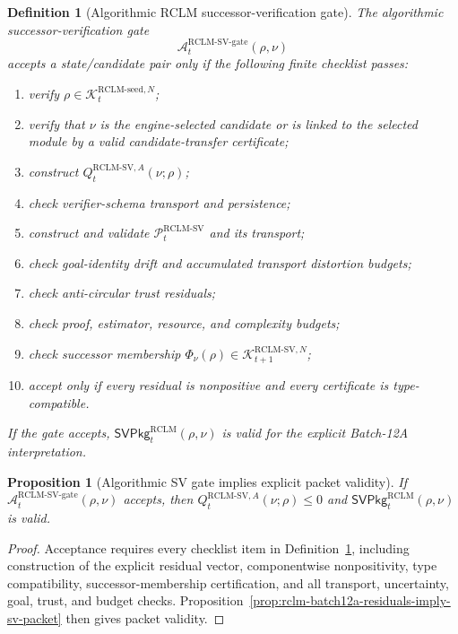 \documentclass[11pt,a4paper]{article}
\newtheorem{proposition}[theorem]{Proposition}
\newtheorem{definition}[theorem]{Definition}
\newcommand{\Pcal}{\mathcal P}
\newcommand{\Acal}{\mathcal A}
\newcommand{\Kcal}{\mathcal K}
\newcommand{\RCLM}{\mathrm{RCLM}}
\newcommand{\gate}{\mathrm{gate}}
\begin{document}
\begin{definition}[Algorithmic RCLM successor-verification gate]
\label{def:rclm-batch12a-algorithmic-sv-gate}
The algorithmic successor-verification gate
\[
\Acal_t^{\RCLM\text{-}\mathrm{SV}\text{-}\gate}(\rho,
\nu)
\]
accepts a state/candidate pair only if the following finite checklist passes:
\begin{enumerate}[label=(\arabic*),leftmargin=1.5em]
    \item verify \(\rho\in\Kcal_t^{\RCLM\text{-}\mathrm{seed},N}\);
    \item verify that \(\nu\) is the engine-selected candidate or is linked to the selected module by a valid candidate-transfer certificate;
    \item construct \(Q_t^{\RCLM\text{-}\mathrm{SV},A}(\nu;\rho)\);
    \item check verifier-schema transport and persistence;
    \item construct and validate \(\Pcal_t^{\RCLM\text{-}\mathrm{SV}}\) and its transport;
    \item check goal-identity drift and accumulated transport distortion budgets;
    \item check anti-circular trust residuals;
    \item check proof, estimator, resource, and complexity budgets;
    \item check successor membership \(\Phi_\nu(\rho)\in\Kcal_{t+1}^{\RCLM\text{-}\mathrm{SV},N}\);
    \item accept only if every residual is nonpositive and every certificate is type-compatible.
\end{enumerate}
If the gate accepts, \(\mathsf{SVPkg}_t^{\RCLM}(\rho,
\nu)\) is valid for the explicit Batch-12A interpretation.
\end{definition}

\begin{proposition}[Algorithmic SV gate implies explicit packet validity]
\label{prop:rclm-batch12a-algorithmic-gate-implies-packet}
If \(\Acal_t^{\RCLM\text{-}\mathrm{SV}\text{-}\gate}(\rho,
\nu)\) accepts, then \(Q_t^{\RCLM\text{-}\mathrm{SV},A}(\nu;\rho)\le0\) and \(\mathsf{SVPkg}_t^{\RCLM}(\rho,
\nu)\) is valid.
\end{proposition}

\begin{proof}
Acceptance requires every checklist item in Definition~\ref{def:rclm-batch12a-algorithmic-sv-gate}, including construction of the explicit residual vector, componentwise nonpositivity, type compatibility, successor-membership certification, and all transport, uncertainty, goal, trust, and budget checks. Proposition~\ref{prop:rclm-batch12a-residuals-imply-sv-packet} then gives packet validity.
\end{proof}
\end{document}
